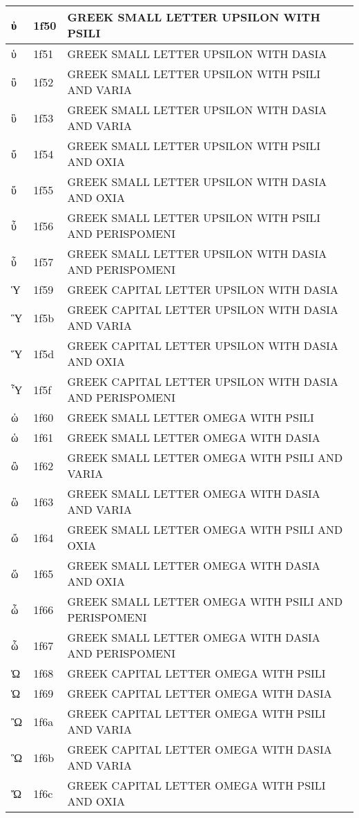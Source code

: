 \documentclass[12pt,letterpaper,openany]{book}
\begin{document}
\begin{center}
\begin{supertabular}{|m{0.25in}|m{0.5in}|m{4in}|}
			ὐ & 1f50 & GREEK SMALL LETTER UPSILON WITH PSILI\\\hline
			ὑ & 1f51 & GREEK SMALL LETTER UPSILON WITH DASIA\\\hline
			ὒ & 1f52 & GREEK SMALL LETTER UPSILON WITH PSILI AND VARIA\\\hline
			ὓ & 1f53 & GREEK SMALL LETTER UPSILON WITH DASIA AND VARIA\\\hline
			ὔ & 1f54 & GREEK SMALL LETTER UPSILON WITH PSILI AND OXIA\\\hline
			ὕ & 1f55 & GREEK SMALL LETTER UPSILON WITH DASIA AND OXIA\\\hline
			ὖ & 1f56 & GREEK SMALL LETTER UPSILON WITH PSILI AND PERISPOMENI\\\hline
			ὗ & 1f57 & GREEK SMALL LETTER UPSILON WITH DASIA AND PERISPOMENI\\\hline
			Ὑ & 1f59 & GREEK CAPITAL LETTER UPSILON WITH DASIA\\\hline
			Ὓ & 1f5b & GREEK CAPITAL LETTER UPSILON WITH DASIA AND VARIA\\\hline
			Ὕ & 1f5d & GREEK CAPITAL LETTER UPSILON WITH DASIA AND OXIA\\\hline
			Ὗ & 1f5f & GREEK CAPITAL LETTER UPSILON WITH DASIA AND PERISPOMENI\\\hline
			ὠ & 1f60 & GREEK SMALL LETTER OMEGA WITH PSILI\\\hline
			ὡ & 1f61 & GREEK SMALL LETTER OMEGA WITH DASIA\\\hline
			ὢ & 1f62 & GREEK SMALL LETTER OMEGA WITH PSILI AND VARIA\\\hline
			ὣ & 1f63 & GREEK SMALL LETTER OMEGA WITH DASIA AND VARIA\\\hline
			ὤ & 1f64 & GREEK SMALL LETTER OMEGA WITH PSILI AND OXIA\\\hline
			ὥ & 1f65 & GREEK SMALL LETTER OMEGA WITH DASIA AND OXIA\\\hline
			ὦ & 1f66 & GREEK SMALL LETTER OMEGA WITH PSILI AND PERISPOMENI\\\hline
			ὧ & 1f67 & GREEK SMALL LETTER OMEGA WITH DASIA AND PERISPOMENI\\\hline
			Ὠ & 1f68 & GREEK CAPITAL LETTER OMEGA WITH PSILI\\\hline
			Ὡ & 1f69 & GREEK CAPITAL LETTER OMEGA WITH DASIA\\\hline
			Ὢ & 1f6a & GREEK CAPITAL LETTER OMEGA WITH PSILI AND VARIA\\\hline
			Ὣ & 1f6b & GREEK CAPITAL LETTER OMEGA WITH DASIA AND VARIA\\\hline
			Ὤ & 1f6c & GREEK CAPITAL LETTER OMEGA WITH PSILI AND OXIA\\\hline

\end{supertabular}
\end{center}
\end{document}
